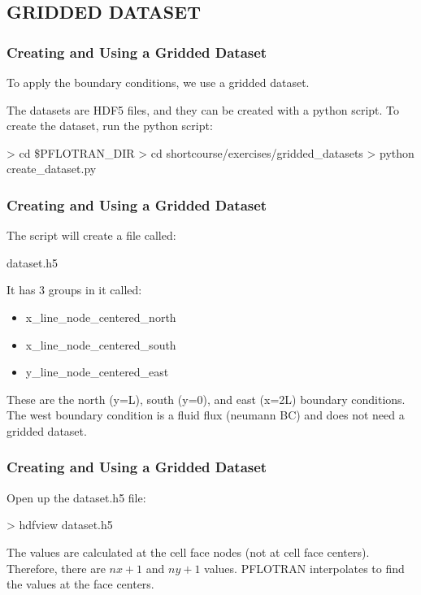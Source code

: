 \documentclass{beamer}
\begin{document}
\subsection{GRIDDED DATASET}

\begin{frame}\frametitle{Creating and Using a Gridded Dataset}

To apply the boundary conditions, we use a gridded dataset.

The datasets are HDF5 files, and they can be created with a python script.
To create the dataset, run the python script:

\begin{semiverbatim}
> cd \$PFLOTRAN_DIR
> cd shortcourse/exercises/gridded_datasets
> python create_dataset.py
\end{semiverbatim}

\end{frame}

\begin{frame}\frametitle{Creating and Using a Gridded Dataset}

The script will create a file called:

\begin{semiverbatim}
dataset.h5
\end{semiverbatim}

It has 3 groups in it called:
\begin{itemize}
  \item x\_line\_node\_centered\_north
  \item x\_line\_node\_centered\_south
  \item y\_line\_node\_centered\_east
\end{itemize}

These are the north (y=L), south (y=0), and east (x=2L) boundary conditions.
The west boundary condition is a fluid flux (neumann BC) and does not need a
gridded dataset.
\end{frame}

\begin{frame}\frametitle{Creating and Using a Gridded Dataset}

Open up the dataset.h5 file:

\begin{semiverbatim}
> hdfview dataset.h5
\end{semiverbatim}

The values are calculated at the cell face nodes (not at cell face centers).
Therefore, there are $nx + 1$ and $ny + 1$ values.
PFLOTRAN interpolates to find the values at the face centers.

\end{frame}
\end{document}
